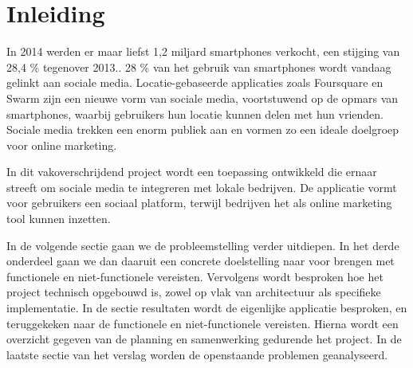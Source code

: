 \chapter{Inleiding}

In 2014 werden er maar liefst 1,2 miljard smartphones verkocht, een stijging van 28,4 \% tegenover 2013.\cite{smartphone_sales}. 28 \% van het gebruik van smartphones wordt vandaag gelinkt aan sociale media. Locatie-gebaseerde applicaties zoals Foursquare\cite{foursquare} en Swarm\cite{swarm} zijn een nieuwe vorm van sociale media, voortstuwend op de opmars van smartphones, waarbij gebruikers hun locatie kunnen delen met hun vrienden.
Sociale media trekken een enorm publiek aan en vormen zo een ideale doelgroep voor online marketing. 

In dit vakoverschrijdend project wordt een toepassing ontwikkeld die ernaar streeft om sociale media te integreren met lokale bedrijven.
De applicatie vormt voor gebruikers een sociaal platform, terwijl bedrijven het als online marketing tool kunnen inzetten.

In de volgende sectie gaan we de probleemstelling verder uitdiepen. In het derde onderdeel  gaan we dan daaruit een concrete doelstelling naar voor brengen met functionele en niet-functionele vereisten. Vervolgens wordt besproken hoe het project technisch opgebouwd is, zowel op vlak van architectuur als specifieke implementatie. In de sectie resultaten wordt de eigenlijke applicatie besproken, en teruggekeken naar de functionele en niet-functionele vereisten. Hierna wordt een overzicht gegeven van de planning en samenwerking gedurende het project. In de laatste sectie van het verslag worden de openstaande problemen geanalyseerd.